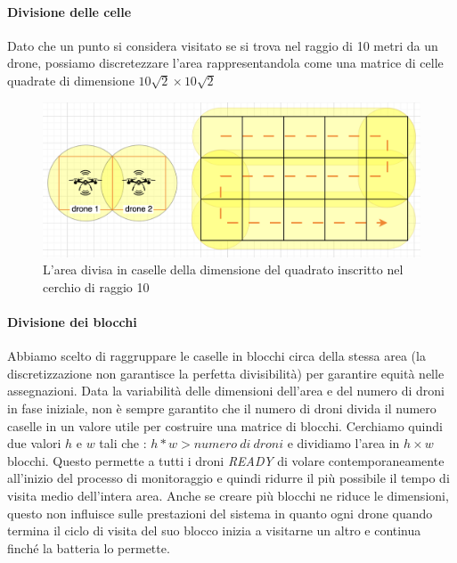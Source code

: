 \documentclass[a4paper, 11pt]{article}
\begin{document}
\paragraph*{Divisione delle celle}
Dato che un punto si considera visitato se si trova nel raggio di 10 metri da un drone, possiamo discretezzare l'area rappresentandola come una matrice di celle quadrate di dimensione $10\sqrt{2} \times 10\sqrt{2}$
\begin{figure}[h]
    \centering
    \includegraphics[height = 5 cm]{image/areedroni.png}
    \caption{L'area divisa in caselle della dimensione del quadrato inscritto nel cerchio di raggio 10}
\end{figure}
\paragraph*{Divisione dei blocchi}
Abbiamo scelto di raggruppare le caselle in blocchi circa della stessa area (la discretizzazione non garantisce la perfetta divisibilità) per garantire equità nelle assegnazioni. 
Data la variabilità delle dimensioni dell'area e del numero di droni in fase iniziale, non è sempre garantito che il numero di droni divida il numero caselle in un valore utile per costruire una matrice di blocchi.
Cerchiamo quindi due valori $h$ e $w$ tali che : $h * w > numero\ di\ droni$ e dividiamo l'area in $h\times w$ blocchi.
Questo permette a tutti i droni \textit{READY} di volare contemporaneamente all'inizio del processo di monitoraggio e quindi ridurre il più possibile il tempo di visita medio dell'intera area.
Anche se creare più blocchi ne riduce le dimensioni, questo non influisce sulle prestazioni del sistema in quanto ogni drone quando termina il ciclo di visita del suo blocco inizia a visitarne un altro e continua finché la batteria lo permette.
\end{document}
